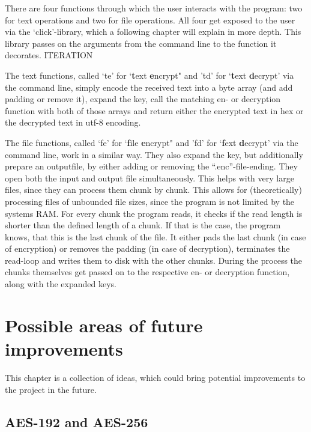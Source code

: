 There are four functions through which the user interacts with the
program: two for text operations and two for file operations. All four
get exposed to the user via the `click'-library, which a following
chapter will explain in more depth. This library passes on the arguments
from the command line to the function it decorates. ITERATION

The text functions, called `te' for `\textbf{t}ext \textbf{e}ncrypt" and
'td' for `\textbf{t}ext \textbf{d}ecrypt' via the command line, simply
encode the received text into a byte array (and add padding or remove
it), expand the key, call the matching en- or decryption function with
both of those arrays and return either the encrypted text in hex or the
decrypted text in utf-8 encoding.

The file functions, called `fe' for `\textbf{f}ile \textbf{e}ncrypt" and
'fd' for `\textbf{f}ext \textbf{d}ecrypt' via the command line, work in
a similar way. They also expand the key, but additionally prepare an
outputfile, by either adding or removing the ``.enc''-file-ending. They
open both the input and output file simultaneously. This helps with very
large files, since they can process them chunk by chunk. This allows for
(theoretically) processing files of unbounded file sizes, since the
program is not limited by the systems RAM. For every chunk the program
reads, it checks if the read length is shorter than the defined length
of a chunk. If that is the case, the program knows, that this is the
last chunk of the file. It either pads the last chunk (in case of
encryption) or removes the padding (in case of decryption), terminates
the read-loop and writes them to disk with the other chunks. During the
process the chunks themselves get passed on to the respective en- or
decryption function, along with the expanded keys.

\hypertarget{possible-areas-of-future-improvements}{%
\section{Possible areas of future
improvements}\label{possible-areas-of-future-improvements}}

This chapter is a collection of ideas, which could bring potential
improvements to the project in the future.

\hypertarget{aes-192-and-aes-256}{%
\subsection{AES-192 and AES-256}\label{aes-192-and-aes-256}}

